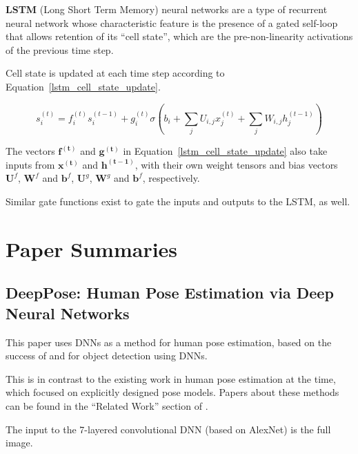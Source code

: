 \documentclass[a4paper, 12pt]{article}
\begin{document}
\label{LSTM}
\textbf{LSTM} (Long Short Term
Memory) neural networks are a type of recurrent neural network whose
characteristic feature is the presence of a gated self-loop that allows
retention of its ``cell state'', which are the pre-non-linearity activations of
the previous time step\cite[Chapter~10]{Goodfellow-et-al-2016-Book}.

Cell state is updated at each time step according to
Equation~\ref{lstm_cell_state_update}.

\begin{equation}
        s_i^{(t)} = f_i^{(t)} s_i^{(t - 1)} + g_i^{(t)}
                \sigma \left( b_i + \sum_j U_{i, j} x_j^{(t)} + \sum_j W_{i, j} h_j^{(t - 1)}\right)
        \label{lstm_cell_state_update}
\end{equation}

The vectors $\boldsymbol{f^{(t)}}$ and $\boldsymbol{g^{(t)}}$ in
Equation~\ref{lstm_cell_state_update} also take inputs from $\boldsymbol{x^{(t)}}$
and $\boldsymbol{h^{(t - 1)}}$, with their own weight tensors and bias vectors
$\boldsymbol{U}^f$, $\boldsymbol{W}^f$ and $\boldsymbol{b}^f$, $\boldsymbol{U}^g$,
$\boldsymbol{W}^g$ and $\boldsymbol{b}^f$, respectively.

Similar gate functions exist to gate the inputs and outputs to the LSTM, as
well.

\section{Paper Summaries}
 
\subsection{DeepPose: Human Pose Estimation via Deep Neural
            Networks\cite{DBLP:journals/corr/ToshevS13}}

This paper uses DNNs as a method for human pose estimation, based on the
success of \cite{NIPS2013_5207} and \cite{DBLP:journals/corr/GirshickDDM13} for
object detection using DNNs.

This is in contrast to the existing work in human pose estimation at the time,
which focused on explicitly designed pose models. Papers about these methods
can be found in the ``Related Work'' section of
\cite{DBLP:journals/corr/ToshevS13}.

The input to the 7-layered convolutional DNN (based on
AlexNet\cite{NIPS2012_4824}) is the full image.
\end{document}
